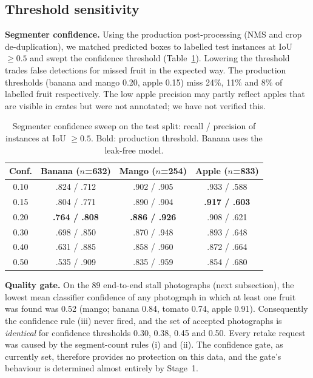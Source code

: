 \documentclass[10pt,twocolumn]{article}
\begin{document}
\subsection{Threshold sensitivity}\label{sec:sens}
\textbf{Segmenter confidence.} Using the production post-processing (NMS and crop de-duplication), we matched predicted boxes to labelled test instances at IoU $\ge 0.5$ and swept the confidence threshold (Table~\ref{tab:sweep}). Lowering the threshold trades false detections for missed fruit in the expected way. The production thresholds (banana and mango 0.20, apple 0.15) miss 24\%, 11\% and 8\% of labelled fruit respectively. The low apple precision may partly reflect apples that are visible in crates but were not annotated; we have not verified this.

\begin{table}[t]
\centering\small
\caption{Segmenter confidence sweep on the test split: recall / precision of instances at IoU $\ge 0.5$. Bold: production threshold. Banana uses the leak-free model.}
\label{tab:sweep}
\setlength{\tabcolsep}{4pt}
\begin{tabular}{@{}cccc@{}}
\toprule
Conf. & Banana ($n$=632) & Mango ($n$=254) & Apple ($n$=833) \\
\midrule
0.10 & .824 / .712 & .902 / .905 & .933 / .588 \\
0.15 & .804 / .771 & .890 / .904 & \textbf{.917 / .603} \\
0.20 & \textbf{.764 / .808} & \textbf{.886 / .926} & .908 / .621 \\
0.30 & .698 / .850 & .870 / .948 & .893 / .648 \\
0.40 & .631 / .885 & .858 / .960 & .872 / .664 \\
0.50 & .535 / .909 & .835 / .959 & .854 / .680 \\
\bottomrule
\end{tabular}
\end{table}

\textbf{Quality gate.} On the 89 end-to-end stall photographs (next subsection), the lowest mean classifier confidence of any photograph in which at least one fruit was found was 0.52 (mango; banana 0.84, tomato 0.74, apple 0.91). Consequently the confidence rule (iii) never fired, and the set of accepted photographs is \emph{identical} for confidence thresholds 0.30, 0.38, 0.45 and 0.50. Every retake request was caused by the segment-count rules (i) and (ii). The confidence gate, as currently set, therefore provides no protection on this data, and the gate's behaviour is determined almost entirely by Stage~1.
\end{document}

